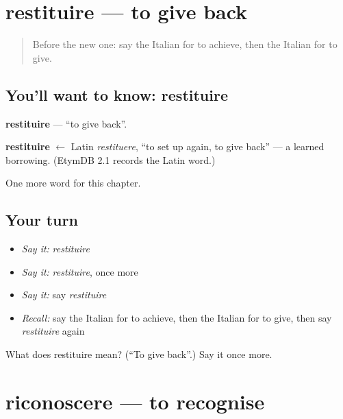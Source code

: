 \section[restituire]{restituire — to give back}

\label{lesson:IT-C239-restituire}



\begin{quote}
Before the new one: say the Italian for to achieve, then the Italian for to give.
\end{quote}

\subsection*{You'll want to know: restituire}
\textbf{restituire} — \textquotedblleft{}to give back\textquotedblright{}.

\begin{cousinweb}
\textbf{restituire} $\leftarrow$ Latin \emph{restituere}, \textquotedblleft{}to set up again, to give back\textquotedblright{} — a learned borrowing. (EtymDB 2.1 records the Latin word.)
\end{cousinweb}

\begin{grammarlens}[title={What you've built}]
One more word for this chapter.
\end{grammarlens}

\subsection*{Your turn}
\begin{itemize}
\raggedright
  \item \emph{Say it:} \emph{restituire}
  \item \emph{Say it:} \emph{restituire}, once more
  \item \emph{Say it:} say \emph{restituire}
  \item \emph{Recall:} say the Italian for to achieve, then the Italian for to give, then say \emph{restituire} again
\end{itemize}

\begin{tcolorbox}[breakable,colback=teal!4,colframe=teal!35!black,title={Before you move on}]
What does restituire mean? (\textquotedblleft{}To give back\textquotedblright{}.) Say it once more.
\end{tcolorbox}
\section[riconoscere]{riconoscere — to recognise}

